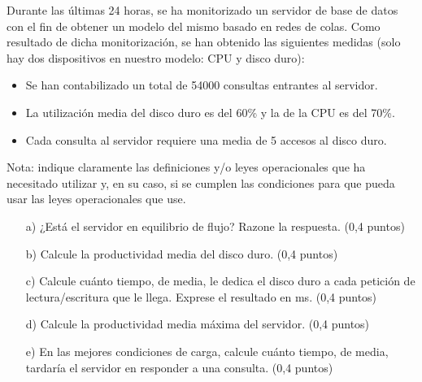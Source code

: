 \documentclass[a4paper,12pt]{article}
\begin{document}
\begin{tcolorbox}[colback=gray!10, colframe=black, title=4.- (2 puntos)]
    Durante las últimas 24 horas, se ha monitorizado un servidor de base de datos con el fin de obtener un modelo del mismo basado en redes de colas. Como resultado de dicha monitorización, se han obtenido las siguientes medidas (solo hay dos dispositivos en nuestro modelo: CPU y disco duro):
    
    \begin{itemize}
        \item Se han contabilizado un total de 54000 consultas entrantes al servidor.
        \item La utilización media del disco duro es del 60\% y la de la CPU es del 70\%.
        \item Cada consulta al servidor requiere una media de 5 accesos al disco duro.
    \end{itemize}
    
    Nota: indique claramente las definiciones y/o leyes operacionales que ha necesitado utilizar y, en su caso, si se cumplen las condiciones para que pueda usar las leyes operacionales que use.
    
    \begin{enumerate}
        \item[a)] ¿Está el servidor en equilibrio de flujo? Razone la respuesta. (0,4 puntos)
        \item[b)] Calcule la productividad media del disco duro. (0,4 puntos)
        \item[c)] Calcule cuánto tiempo, de media, le dedica el disco duro a cada petición de lectura/escritura que le llega. Exprese el resultado en ms. (0,4 puntos)
        \item[d)] Calcule la productividad media máxima del servidor. (0,4 puntos)
        \item[e)] En las mejores condiciones de carga, calcule cuánto tiempo, de media, tardaría el servidor en responder a una consulta. (0,4 puntos)
    \end{enumerate}
    \end{tcolorbox}
    
\end{document}
